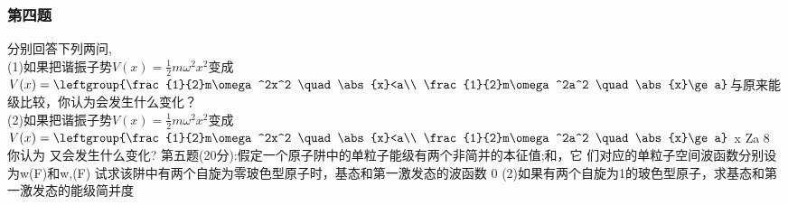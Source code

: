 \subsubsection{第四题}
分别回答下列两问,\\
(1)如果把谐振子势$V(x)=\frac{1}{2}m\omega^2x^2$变成$V(x)=\leftgroup{\frac{1}{2}m\omega^2x^2 \quad \abs{x}<a\\ \frac{1}{2}m\omega^2a^2 \quad \abs{x}\ge a}$与原来能级比较，你认为会发生什么变化？\\
(2)如果把谐振子势$V(x)=\frac{1}{2}m\omega^2x^2$变成$V(x)=\leftgroup{\frac{1}{2}m\omega^2x^2 \quad \abs{x}<a\\ \frac{1}{2}m\omega^2a^2 \quad \abs{x}\ge a}$
x Za
8
你认为
又会发生什么变化?
第五题(20分):假定一个原子阱中的单粒子能级有两个非简并的本征值;和，它
们对应的单粒子空间波函数分别设为w(F)和w,(F)
试求该阱中有两个自旋为零玻色型原子时，基态和第一激发态的波函数
0
(2)如果有两个自旋为1的玻色型原子，求基态和第一激发态的能级简并度
